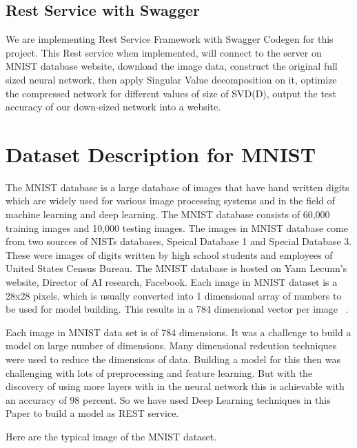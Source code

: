 \subsection{Rest Service with Swagger}

We are implementing Rest Service Framework with Swagger Codegen for this
project. This Rest service when implemented, will connect to the server on MNIST
database website, download the image data, construct the original full sized
neural network, then apply Singular Value decomposition on it, optimize the
compressed network for different values of size of SVD(D), output the test
accuracy of our down-sized network into a website.

\section{Dataset Description for MNIST}

The MNIST database is a large database of images that have hand written digits
which are widely used for various image processing systems and in the field of
machine learning and deep learning. The MNIST database consists of 60,000
training images and 10,000 testing images. The images in MNIST database come
from two sources of NISTs databases, Speical Database 1 and Special Database
3. These were images of digits written by high school students and employees
of United States Census Bureau. The MNIST database is hosted on  Yann Lecunn's
website, Director of AI research, Facebook. Each image in MNIST dataset is a
28x28 pixels, which is usually converted into 1 dimensional array of numbers
to be used for model building. This results in a 784 dimensional vector per
image ~\cite{hid-sp18-401-MNIST-dataset}.

Each image in MNIST data set is of 784 dimensions. It was a challenge to build a
model on large number of dimensions. Many dimensional redcution techniques were
used to reduce the dimensions of data. Building a model for this then was
challenging with lots of preprocessing and feature learning. But with the
discovery of using more layers with in the neural network this is achievable
with an accuracy of 98 percent. So we have used Deep Learning techniques in this
Paper to build a model as REST service.

Here are the typical image of the MNIST dataset.

